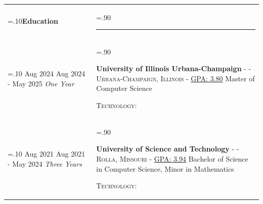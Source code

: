 \documentclass[10pt]{article}
\newcommand{\timeFrame}[3] {
  \if\relax\detokenize{#2}\relax
    #1
  \else
    #1 - #2
  \fi
  \newline
  \scriptsize \textit{#3}
}
\newcommand{\entry}[6] {
  \textbf{#1}
  \if\relax\detokenize{#2}\relax
  \else
       - \textsc{#2}
  \fi
  \if\relax\detokenize{#3}\relax
  \else
      - \textsc{#3}
  \fi
  \if\relax\detokenize{#4}\relax
  \else
      - \href{https://#4}{#4}
  \fi
  \newline #5
  \if\relax\detokenize{#6}\relax
  \else
      \newline \textsc{Technology:} #6
  \fi
  \\
}
\newcommand{\horizontalLine}[0] {
    \noindent\rule{.90\linewidth}{0.4pt}
}
\begin{document}
\begin{tabularx}{\linewidth}{>{\hsize=.10\hsize}X>{\hsize=.90\hsize}X}

\textbf{Education} & \horizontalLine \\

\timeFrame{Aug 2024}{May 2025}{One Year} &
\entry{University of Illinois Urbana-Champaign}
  {}
  {Urbana-Champaign, Illinois}
  {GPA: 3.80}
  {
  Master of Computer Science \newline
  }
  {}

\timeFrame{Aug 2021}{May 2024}{Three Years} &
\entry{University of Science and Technology}
  {}
  {Rolla, Missouri}
  {GPA: 3.94}
  {
  Bachelor of Science in Computer Science, Minor in Mathematics
  }
  {}

\end{tabularx}
\end{document}

